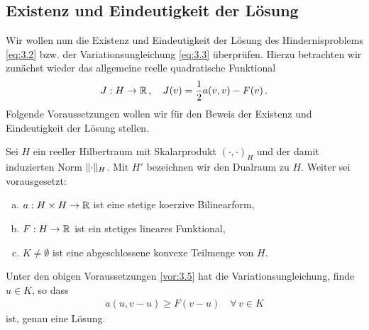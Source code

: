 



\subsection{Existenz und Eindeutigkeit der Lösung}
\label{kap:3.1.2}


Wir wollen nun die Existenz und Eindeutigkeit der Lösung des Hindernisproblems \eqref{eq:3.2} bzw. der Variationsungleichung \eqref{eq:3.3} überprüfen. Hierzu betrachten wir zunächst wieder das allgemeine reelle quadratische Funktional
\[
	J: H \rightarrow \mathbb{R} \, ,\quad J(v) = \frac 1 2 a(v,v) - F(v) \, .
\]
Folgende Voraussetzungen wollen wir für den Beweis der Existenz und Eindeutigkeit der Lösung stellen.

\begin{vor}\label{vor:3.5}
Sei $H$ ein reeller Hilbertraum mit Skalarprodukt $(\cdot,\cdot)_H$ und der damit induzierten Norm $\lVert \cdot\rVert_H$. Mit $H'$ bezeichnen wir den Dualraum zu $H$. Weiter sei vorausgesetzt:
\begin{enumerate}[(a)]
\item $a: H\times H \rightarrow \mathbb{R}$ ist eine stetige koerzive Bilinearform,
\item $F:H\rightarrow\mathbb{R}$ ist ein stetiges lineares Funktional,
\item $K\not = \emptyset$ ist eine abgeschlossene konvexe Teilmenge von $H$.
\end{enumerate}
\end{vor}


\begin{theorem}\label{theorem:3.6}
Unter den obigen Voraussetzungen \ref{vor:3.5} hat die Variationsungleichung, finde $u\in K$, so dass
\begin{align}\label{eq:3.7}
	a(u,v-u) \ge F(v-u) \quad \forall \, v \in K
\end{align}
ist, genau eine Lösung.
\end{theorem}

